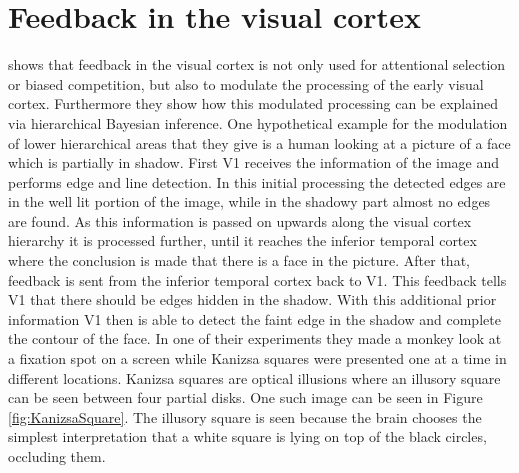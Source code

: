 \section{Feedback in the visual cortex}
\label{section:feedbackInVisualCortex}
\citet{HierachicalBayesVisualCortex} shows that feedback in the visual cortex is not only used for attentional selection or biased competition, but also to modulate the processing of the early visual cortex. Furthermore they show how this modulated processing can be explained via hierarchical Bayesian inference. One hypothetical example for the modulation of lower hierarchical areas that they give is a human looking at a picture of a face which is partially in shadow. First V1 receives the information of the image and performs edge and line detection. In this initial processing the detected edges are in the well lit portion of the image, while in the shadowy part almost no edges are found. As this information is passed on upwards along the visual cortex hierarchy it is processed further, until it reaches the inferior temporal cortex where the conclusion is made that there is a face in the picture. After that, feedback is sent from the inferior temporal cortex back to V1. This feedback tells V1 that there should be edges hidden in the shadow. With this additional prior information V1 then is able to detect the faint edge in the shadow and complete the contour of the face. 
In one of their experiments they made a monkey look at a fixation spot on a screen while Kanizsa squares were presented one at a time in different locations. Kanizsa squares are optical illusions where an illusory square can be seen between four partial disks. One such image can be seen in Figure \ref{fig:KanizsaSquare}. The illusory square is seen because the brain chooses the simplest interpretation that a white square is lying on top of the black circles, occluding them.
